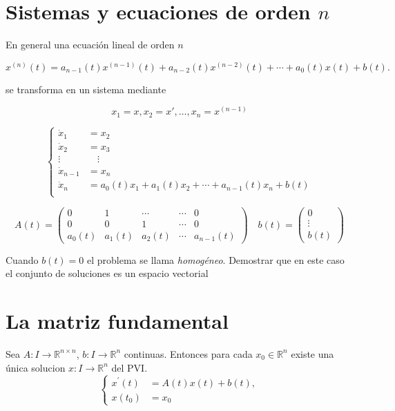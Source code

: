 \section{Sistemas y ecuaciones de orden $n$}

En general una ecuación lineal de orden $n$

$$
x^{(n)}(t)=a_{n-1}(t) x^{(n-1)}(t)+a_{n-2}(t) x^{(n-2)}(t)+\cdots+a_{0}(t) x(t)+b(t).
$$

se transforma en un sistema mediante

$$x_{1}=x, x_{2}=x', \ldots, x_{n}=x^{(n-1)}$$


$$
\left\{
\begin{split}
\dot{x}_{1}&=x_{2} \\
\dot{x}_{2}&=x_{3} \\
\vdots &  \quad\vdots\\
\dot{x}_{n-1}&=x_{n} \\
\dot{x}_{n}&=a_{0}(t) x_{1}+a_{1}(t) x_{2}+\cdots+a_{n-1}(t) x_{n}+b(t)\\
\end{split}
\right.
$$

$$
A(t)=\begin{pmatrix}
0 & 1 & \cdots &\cdots& 0 \\
0 & 0 & 1 & \cdots & 0 \\
a_{0}(t) & a_{1}(t)&a_{2}(t) & \cdots & a_{n-1}(t)
\end{pmatrix}
\quad 
b(t)=\begin{pmatrix} 0\\
\vdots \\
b(t)
\end{pmatrix}
$$


\begin{ejercicio}{} Cuando $b(t)=0$ el problema se llama \emph{ homogéneo}. Demostrar que en este caso  el conjunto
de soluciones es un espacio vectorial 
\end{ejercicio}



 \section{La matriz fundamental}

 \begin{teorema}{} Sea $A:I \rightarrow \mathbb{R}^{n \times n}$, $b: I \rightarrow \mathbb{R}^{n}$ continuas. Entonces para cada $x_{0} \in \mathbb{R}^{n}$ existe una única solucion $x: I \rightarrow \mathbb{R}^{n}$ del PVI.
$$
\left\{
\begin{array}{ll}
 x^{\prime}(t)&=A(t) x(t)+b(t), \\
 x\left(t_{0}\right)&=x_{0}
\end{array}
\right.
$$
\end{teorema}
 
